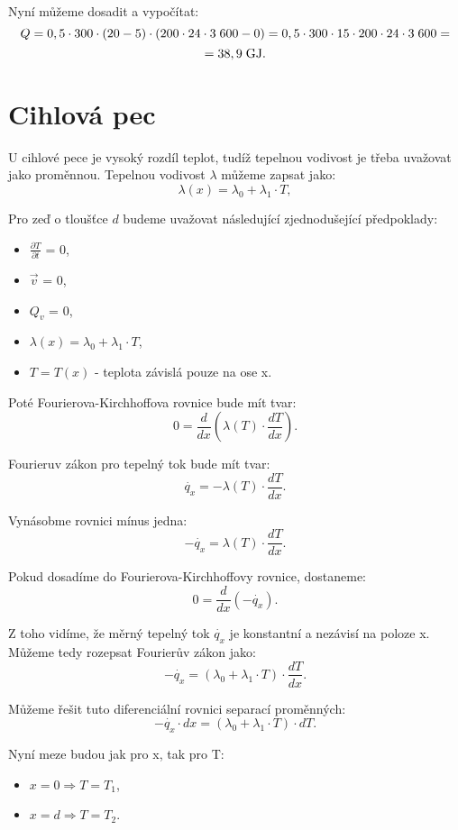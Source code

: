 \documentclass{article}
\begin{document}
Nyní můžeme dosadit a vypočítat:
$$
    Q = 0,5 \cdot 300 \cdot (20 - 5) \cdot (200 \cdot 24 \cdot 3 \; 600 - 0) = 0,5 \cdot 300 \cdot 15 \cdot 200 \cdot 24 \cdot 3 \; 600 =
$$
$$
    = 38,9 \; \textrm{GJ}.
$$

\newpage




\section{ Cihlová pec \spicy \spicy \spicy}

U cihlové pece je vysoký rozdíl teplot, tudíž tepelnou vodivost je třeba uvažovat jako proměnnou. Tepelnou vodivost $\lambda$ můžeme zapsat jako:
$$
    \lambda (x) = \lambda_0 + \lambda_1 \cdot T,
$$

Pro zeď o tloušťce $d$ budeme uvažovat následující zjednodušející předpoklady:
\begin{itemize}
    \item $\frac{\partial T}{\partial t}$ = 0,
    \item $\vec{v}$ = 0,
    \item $Q_v$ = 0,
    \item $\lambda (x) = \lambda_0 + \lambda_1 \cdot T$,
    \item $T = T(x)$ - teplota závislá pouze na ose x.
\end{itemize}

Poté Fourierova-Kirchhoffova rovnice bude mít tvar:
$$
    0 = \frac{d}{dx} \left ( \lambda (T) \cdot \frac{dT}{dx} \right ).
$$

Fourieruv zákon pro tepelný tok bude mít tvar:
$$
    \dot{q_x} = - \lambda (T) \cdot \frac{dT}{dx}.
$$

Vynásobme rovnici mínus jedna:
$$
    - \dot{q_x} = \lambda (T) \cdot \frac{dT}{dx}.
$$

Pokud dosadíme do Fourierova-Kirchhoffovy rovnice, dostaneme:
$$
    0 = \frac{d}{dx} \left ( - \dot{q_x} \right ).
$$

Z toho vidíme, že měrný tepelný tok $\dot{q_x}$ je konstantní a nezávisí na poloze x. Můžeme tedy rozepsat Fourierův zákon jako:
$$
    - \dot{q_x} = \left( \lambda_0 + \lambda_1 \cdot T \right) \cdot \frac{dT}{dx}.
$$

Můžeme řešit tuto diferenciální rovnici separací proměnných:
$$
    - \dot{q_x} \cdot dx = \left( \lambda_0 + \lambda_1 \cdot T \right) \cdot dT.
$$

Nyní meze budou jak pro x, tak pro T:
\begin{itemize}
    \item $x = 0 \Rightarrow T = T_1$,
    \item $x = d \Rightarrow T = T_2$.
\end{itemize}
\end{document}
